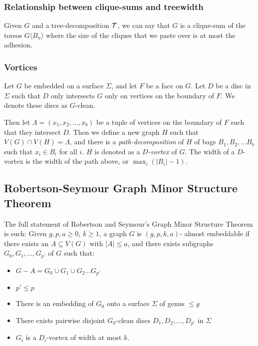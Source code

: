 \subsubsection{Relationship between clique-sums and treewidth}
Given $G$ and a tree-decomposition $\mathcal{T}$, we can say that $G$ is a clique-sum of the torsos $G\langle B_x \rangle$ where the size of the cliques that we paste over is at most the adhesion.

\subsubsection{Vortices}\label{sssec:vortices}
Let $G$ be embedded on a surface $\Sigma$, and let $F$ be a face on $G$. Let $D$ be a disc in $\Sigma$ such that $D$ only intersects $G$ only on vertices on the boundary of $F$. We denote these discs as $G$-clean. 

Then let $\Lambda = (x_1, x_2, ..., x_b)$ be a tuple of vertices on the boundary of $F$ such that they intersect $D$. Then we define a new graph $H$ such that $V(G) \cap V(H) = \Lambda$, and there is a \textit{path-decomposition} of $H$ of bags $B_1, B_2, ... B_b$ such that $x_i \in B_i$ for all $i$. $H$ is denoted as a \textit{$D$-vortex} of $G$. The width of a $D$-vortex is the width of the path above, or $\max_i(|B_i| - 1)$. 

\subsection{Robertson-Seymour Graph Minor Structure Theorem}\label{ssec:Robertson_Seymour_Graph_Structure}
The full statement of Robertson and Seymour's Graph Minor Structure Theorem \cite{robertsonGraphMinorsXVI2003}is such:
Given $g, p, a \geq 0$, $k \geq 1$, a graph $G$ is $(g, p, k, a)$- almost embeddable if there exists an $A \subseteq V(G)$ with $|A| \leq a$, and there exists subgraphs $G_0, G_1, ...,  G_{p'}$ of $G$ such that:
\begin{itemize}
	\item $G - A = G_0 \cup G_1 \cup G_2 ... G_{p'}$
	\item $p' \leq p$
	\item There is an embedding of $G_0$ onto a surface $\Sigma$ of genus $\leq g$
	\item There exists pairwise disjoint $G_0$-clean discs $D_1, D_2, ..., D_{p'}$ in $\Sigma$
	\item $G_i$ is a $D_i$-vortex of width at most $k$.
\end{itemize}

